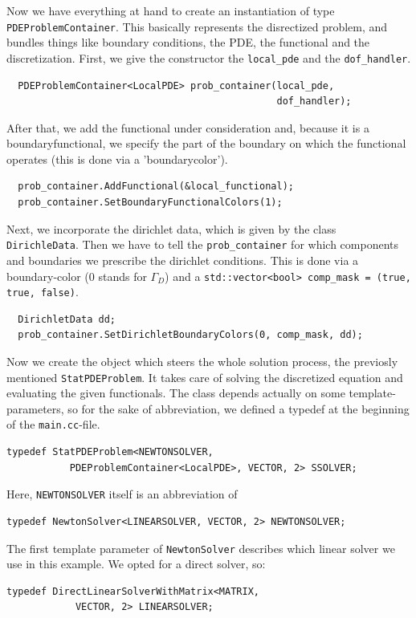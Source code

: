 \documentclass[prodmode,acmtoms]{acmsmall}
\numberwithin{equation}{section}
\begin{document}
Now we have everything at hand to create an instantiation of type \texttt{PDEProblemContainer}. This basically represents the disrectized problem, and bundles things like boundary conditions, the PDE, the functional and the discretization. First, we give the constructor the \texttt{local\_pde} and the \texttt{dof\_handler}.
\begin{lstlisting}
  PDEProblemContainer<LocalPDE> prob_container(local_pde,
                                               dof_handler);
\end{lstlisting}
After that, we add the functional under consideration and, because it is a boundaryfunctional, we specify the part of the boundary on which the functional operates (this is done via a 'boundarycolor').
\begin{lstlisting}
  prob_container.AddFunctional(&local_functional);
  prob_container.SetBoundaryFunctionalColors(1);
\end{lstlisting}
Next, we incorporate the dirichlet data, which is given by the class \texttt{DirichleData}. Then we have to tell the \texttt{prob\_container} for which components and boundaries we prescribe the dirichlet conditions. This is done via a boundary-color (0 stands for $\Gamma_D$) and a \texttt{std::vector<bool> comp\_mask = (true, true, false)}.
\begin{lstlisting}
  DirichletData dd;
  prob_container.SetDirichletBoundaryColors(0, comp_mask, dd);
\end{lstlisting}
Now we create the object which steers the whole solution process, the previosly mentioned \texttt{StatPDEProblem}. It takes care of solving the discretized equation and evaluating the given functionals. The class depends actually on some template-parameters, so for the sake of abbreviation, we defined a typedef at the beginning of the \texttt{main.cc}-file.
\begin{lstlisting}
typedef StatPDEProblem<NEWTONSOLVER,
           PDEProblemContainer<LocalPDE>, VECTOR, 2> SSOLVER;
\end{lstlisting}
Here, \texttt{NEWTONSOLVER} itself is an abbreviation of
\begin{lstlisting}
typedef NewtonSolver<LINEARSOLVER, VECTOR, 2> NEWTONSOLVER;
\end{lstlisting}
The first template parameter of \texttt{NewtonSolver} describes which linear solver we use in this example. We opted for a direct solver, so: 
\begin{lstlisting}
typedef DirectLinearSolverWithMatrix<MATRIX,
            VECTOR, 2> LINEARSOLVER;
\end{lstlisting}
\end{document}
